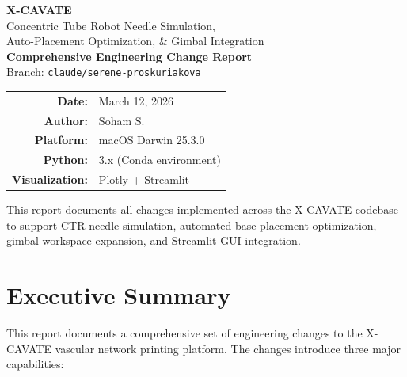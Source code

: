 \documentclass[11pt,a4paper]{article}
\begin{document}
\begin{titlepage}
\centering
\vspace*{3cm}

{\Huge\bfseries\textcolor{accentblue}{X-CAVATE}}\\[0.5cm]
{\Large\textcolor{accentblue!70!black}{Concentric Tube Robot Needle Simulation,\\Auto-Placement Optimization, \& Gimbal Integration}}\\[2cm]

{\large\textbf{Comprehensive Engineering Change Report}}\\[0.5cm]
{\large Branch: \texttt{claude/serene-proskuriakova}}\\[2cm]

\begin{tabular}{rl}
\textbf{Date:} & March 12, 2026 \\
\textbf{Author:} & Soham S. \\
\textbf{Platform:} & macOS Darwin 25.3.0 \\
\textbf{Python:} & 3.x (Conda environment) \\
\textbf{Visualization:} & Plotly + Streamlit \\
\end{tabular}

\vfill

{\small\textcolor{codegray}{This report documents all changes implemented across the X-CAVATE codebase to support CTR needle simulation, automated base placement optimization, gimbal workspace expansion, and Streamlit GUI integration.}}

\end{titlepage}

\tableofcontents
\newpage

\section{Executive Summary}

This report documents a comprehensive set of engineering changes to the X-CAVATE vascular network printing platform. The changes introduce three major capabilities:
\end{document}
